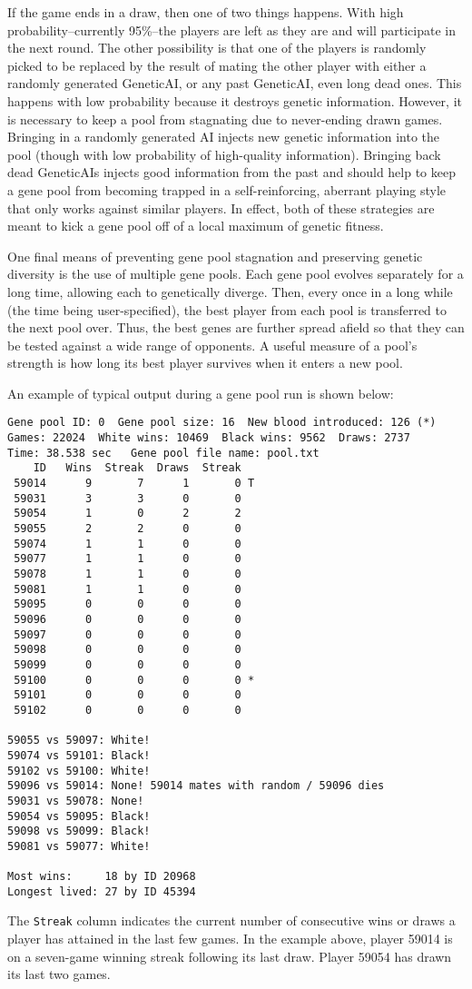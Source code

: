 \documentclass[letter]{article}
\renewcommand\_{\textunderscore\allowbreak}
\begin{document}
If the game ends in  a draw, then one of two things happens. With high probability--currently 95\%--the players are left as they are and will participate in the next round. The other possibility is that one of the players is randomly picked to be replaced by the result of mating the other player with either a randomly generated Genetic\_AI, or any past Genetic\_AI, even long dead ones. This happens with low probability because it destroys genetic information. However, it is necessary to keep a pool from stagnating due to never-ending drawn games. Bringing in a randomly generated AI injects new genetic information into the pool (though with low probability of high-quality information). Bringing back dead Genetic\_AIs injects good information from the past and should help to keep a gene pool from becoming trapped in a self-reinforcing, aberrant playing style that only works against similar players. In effect, both of these strategies are meant to kick a gene pool off of a local maximum of genetic fitness.

One final means of preventing gene pool stagnation and preserving genetic diversity is the use of multiple gene pools. Each gene pool evolves separately for a long time, allowing each to genetically diverge. Then, every once in a long while (the time being user-specified), the best player from each pool is transferred to the next pool over. Thus, the best genes are further spread afield so that they can be tested against a wide range of opponents. A useful measure of a pool's strength is how long its best player survives when it enters a new pool.

An example of typical output during a gene pool run is shown below:
\begin{verbatim}
Gene pool ID: 0  Gene pool size: 16  New blood introduced: 126 (*)
Games: 22024  White wins: 10469  Black wins: 9562  Draws: 2737
Time: 38.538 sec   Gene pool file name: pool.txt
    ID   Wins  Streak  Draws  Streak
 59014      9       7      1       0 T
 59031      3       3      0       0
 59054      1       0      2       2
 59055      2       2      0       0
 59074      1       1      0       0
 59077      1       1      0       0
 59078      1       1      0       0
 59081      1       1      0       0
 59095      0       0      0       0
 59096      0       0      0       0
 59097      0       0      0       0
 59098      0       0      0       0
 59099      0       0      0       0
 59100      0       0      0       0 *
 59101      0       0      0       0
 59102      0       0      0       0

59055 vs 59097: White!
59074 vs 59101: Black!
59102 vs 59100: White!
59096 vs 59014: None! 59014 mates with random / 59096 dies
59031 vs 59078: None!
59054 vs 59095: Black!
59098 vs 59099: Black!
59081 vs 59077: White!

Most wins:     18 by ID 20968
Longest lived: 27 by ID 45394

\end{verbatim}
The \verb|Streak| column indicates the current number of consecutive wins or draws a player has attained in the last few games. In the example above, player 59014 is on a seven-game winning streak following its last draw. Player 59054 has drawn its last two games.
\end{document}
